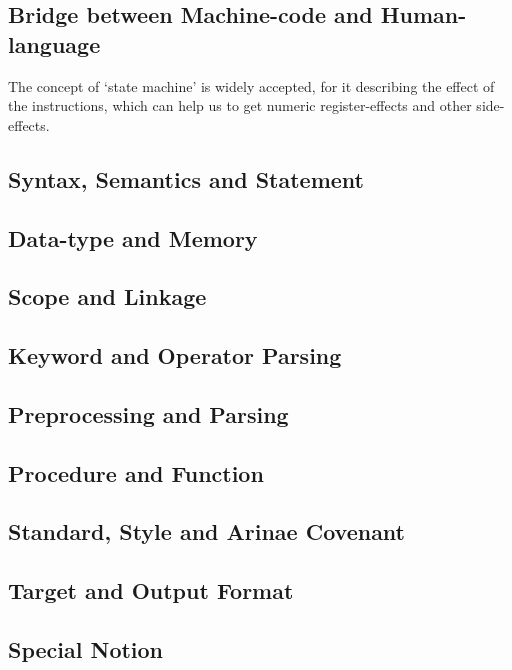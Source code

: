 
\subsection{Bridge between Machine-code and Human-language}

The concept of `state machine' is widely accepted, for it describing the effect of the instructions, which can help us to get numeric register-effects and other side-effects.

\subsection{Syntax, Semantics and Statement}


\subsection{Data-type and Memory}


\subsection{Scope and Linkage}


\subsection{Keyword and Operator Parsing}




\subsection{Preprocessing and Parsing}


\subsection{Procedure and Function}


\subsection{Standard, Style and Arinae Covenant}


\subsection{Target and Output Format}


\subsection{Special Notion}

